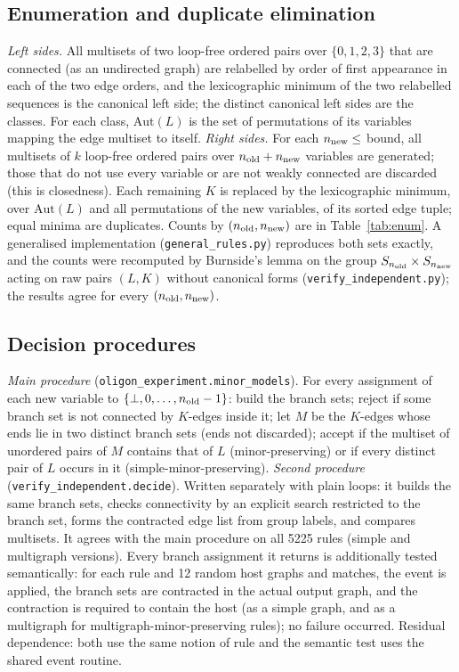 \documentclass[10pt]{article}
\theoremstyle{definition}
\theoremstyle{plain}
\theoremstyle{remark}
\begin{document}
\subsection{Enumeration and duplicate elimination}
\emph{Left sides.} All multisets of two loop-free ordered pairs over $\{0,1,2,3\}$ that are connected (as an undirected graph) are relabelled by order of first appearance in each of the two edge orders, and the lexicographic minimum of the two relabelled sequences is the canonical left side; the distinct canonical left sides are the classes. For each class, $\mathrm{Aut}(L)$ is the set of permutations of its variables mapping the edge multiset to itself. \emph{Right sides.} For each $n_{\rm new}\le$ bound, all multisets of $k$ loop-free ordered pairs over $n_{\rm old}+n_{\rm new}$ variables are generated; those that do not use every variable or are not weakly connected are discarded (this is closedness). Each remaining $K$ is replaced by the lexicographic minimum, over $\mathrm{Aut}(L)$ and all permutations of the new variables, of its sorted edge tuple; equal minima are duplicates. Counts by $(n_{\rm old},n_{\rm new})$ are in Table~\ref{tab:enum}. A generalised implementation (\texttt{general\_rules.py}) reproduces both sets exactly, and the counts were recomputed by Burnside's lemma on the group $S_{n_{\rm old}}\times S_{n_{\rm new}}$ acting on raw pairs $(L,K)$ without canonical forms (\texttt{verify\_independent.py}); the results agree for every $(n_{\rm old},n_{\rm new})$.
\begin{table}[t]\centering\small

\caption{Closed rules in $\mathcal S$ by $(n_{\rm old},n_{\rm new})$; ``not'': rules that are not simple-minor-preserving (each has a verified certificate).}\label{tab:enum}
\end{table}
\subsection{Decision procedures}
\emph{Main procedure} (\texttt{oligon\_experiment.minor\_models}). For every assignment of each new variable to $\{\bot,0,\dots,n_{\rm old}-1\}$: build the branch sets; reject if some branch set is not connected by $K$-edges inside it; let $M$ be the $K$-edges whose ends lie in two distinct branch sets (ends not discarded); accept if the multiset of unordered pairs of $M$ contains that of $L$ (minor-preserving) or if every distinct pair of $L$ occurs in it (simple-minor-preserving).
\emph{Second procedure} (\texttt{verify\_independent.decide}). Written separately with plain loops: it builds the same branch sets, checks connectivity by an explicit search restricted to the branch set, forms the contracted edge list from group labels, and compares multisets. It agrees with the main procedure on all 5225 rules (simple and multigraph versions). Every branch assignment it returns is additionally tested semantically: for each rule and 12 random host graphs and matches, the event is applied, the branch sets are contracted in the actual output graph, and the contraction is required to contain the host (as a simple graph, and as a multigraph for multigraph-minor-preserving rules); no failure occurred. Residual dependence: both use the same notion of rule and the semantic test uses the shared event routine.
\end{document}
